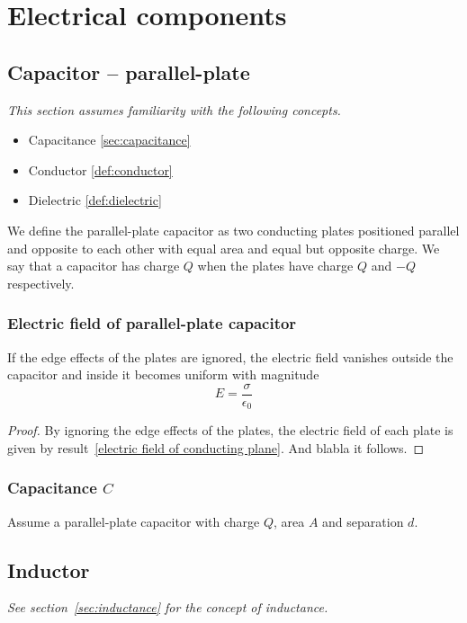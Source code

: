 \chapter{Electrical components}


\section{Capacitor -- \normalfont parallel-plate}

\emph{This section assumes familiarity with the following concepts.}
\begin{itemize}
\item Capacitance \ref{sec:capacitance}
\item Conductor \ref{def:conductor}
\item Dielectric \ref{def:dielectric}
\end{itemize}

We define the parallel-plate capacitor as two conducting plates
positioned parallel and opposite to each other with equal area and
equal but opposite charge. We say that a capacitor has charge $Q$ when
the plates have charge $Q$ and $-Q$ respectively.

\subsection{Electric field of parallel-plate capacitor}

If the edge effects of the plates are ignored, the electric field
vanishes outside the capacitor and inside it becomes uniform with
magnitude
\begin{equation*}
  E=\frac{\sigma}{\epsilon_0}
\end{equation*}
\begin{proof}
  By ignoring the edge effects of the plates, the electric field of each
  plate is given by result~\ref{electric field of conducting
    plane}. And blabla it follows.
\end{proof}

\subsection{Capacitance $C$}

Assume a parallel-plate capacitor with charge $Q$, area $A$ and
separation $d$.



\section{Inductor}

\emph{See section~\ref{sec:inductance} for the concept of
  inductance.}
